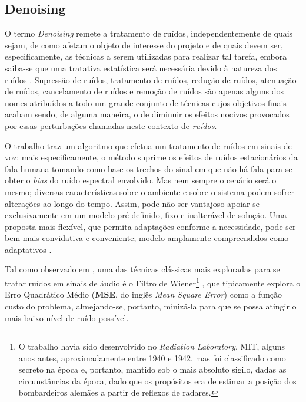 \subsection{Denoising}
\label{subsec:bss_denoising}

O termo \textit{Denoising} remete a tratamento de ruídos, independentemente de quais sejam, de como afetam o objeto de interesse do projeto e de quais devem ser, especificamente, as técnicas a serem utilizadas para realizar tal tarefa, embora saiba-se que uma tratativa estatística será necessária devido à natureza dos ruídos \citep{watkinson2001art}. Supressão de ruídos, tratamento de ruídos, redução de ruídos, atenuação de ruídos, cancelamento de ruídos e remoção de ruídos são apenas alguns dos nomes atribuídos a todo um grande conjunto de técnicas cujos objetivos finais acabam sendo, de alguma maneira, o de diminuir os efeitos nocivos provocados por essas perturbações chamadas neste contexto de \textit{ruídos}.

O trabalho \citep{1163209} traz um algoritmo que efetua um tratamento de ruídos em sinais de voz; mais especificamente, o método suprime os efeitos de ruídos estacionários da fala humana tomando como base os trechos do sinal em que não há fala para se obter o \textit{bias} do ruído espectral envolvido. Mas nem sempre o cenário será o mesmo; diversas características sobre o ambiente e sobre o sistema podem sofrer alterações ao longo do tempo. Assim, pode não ser vantajoso apoiar-se exclusivamente em um modelo pré-definido, fixo e inalterável de solução. Uma proposta mais flexível, que permita adaptações conforme a necessidade, pode ser bem mais convidativa e conveniente; modelo amplamente compreendidos como adaptativos \citep{1451965, 382009}.

Tal como observado em \citep{7805139, 6334422, 1643650, SPRIET20042367}, uma das técnicas clássicas mais exploradas para se tratar ruídos em sinais de áudio é o Filtro de Wiener\footnote{O trabalho havia sido desenvolvido no \textit{Radiation Laboratory}, MIT, alguns anos antes, aproximadamente entre 1940 e 1942, mas foi classificado como secreto na época e, portanto, mantido sob o mais absoluto sigilo, dadas as circunstâncias da época, dado que os propósitos era de estimar a posição dos bombardeiros alemães a partir de reflexos de radares.} \citep{6284754}, que tipicamente explora o Erro Quadrático Médio (\textbf{MSE}, do inglês \textit{Mean Square Error}) como a função custo do problema, almejando-se, portanto, minizá-la para que se possa atingir o mais baixo nível de ruído possível.

